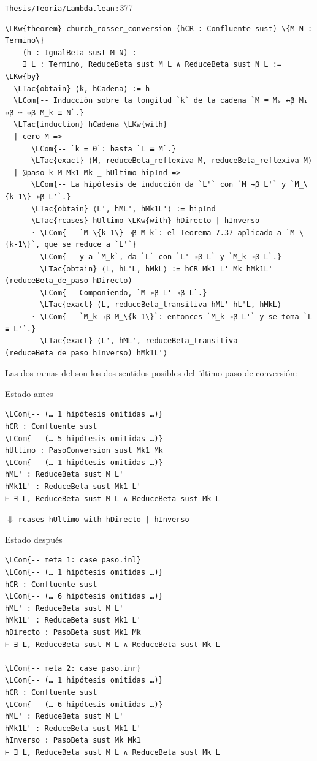 \documentclass[11pt,a4paper]{article}
\newcommand{\LKw}[1]{\textcolor{kw}{\bfseries #1}}
\newcommand{\LTac}[1]{\textcolor{tac}{\bfseries #1}}
\newcommand{\LCom}[1]{\textcolor{com}{\itshape #1}}
\newcommand{\lean}[1]{\texttt{\directlua{leanbreak("\luaescapestring{\detokenize{#1}}")}}}
\newcommand{\ruta}[2]{\texttt{#1}\,:\,#2}
\newcommand{\tacticaentre}[1]{\begin{center}\vspace{-2pt}\(\Downarrow\)\enspace
  \texttt{\small #1}\vspace{-2pt}\end{center}}
\begin{document}
\begin{codigolean}{\ruta{Thesis/Teoria/Lambda.lean}{377}}
\begin{Verbatim}[commandchars=\\\{\}]
\LKw{theorem} church_rosser_conversion (hCR : Confluente sust) \{M N : Termino\}
    (h : IgualBeta sust M N) :
    ∃ L : Termino, ReduceBeta sust M L ∧ ReduceBeta sust N L := \LKw{by}
  \LTac{obtain} ⟨k, hCadena⟩ := h
  \LCom{-- Inducción sobre la longitud `k` de la cadena `M ≡ M₀ ↔β M₁ ↔β ⋯ ↔β M_k ≡ N`.}
  \LTac{induction} hCadena \LKw{with}
  | cero M =>
      \LCom{-- `k = 0`: basta `L ≡ M`.}
      \LTac{exact} ⟨M, reduceBeta_reflexiva M, reduceBeta_reflexiva M⟩
  | @paso k M Mk1 Mk _ hUltimo hipInd =>
      \LCom{-- La hipótesis de inducción da `L'` con `M ↠β L'` y `M_\{k-1\} ↠β L'`.}
      \LTac{obtain} ⟨L', hML', hMk1L'⟩ := hipInd
      \LTac{rcases} hUltimo \LKw{with} hDirecto | hInverso
      · \LCom{-- `M_\{k-1\} →β M_k`: el Teorema 7.37 aplicado a `M_\{k-1\}`, que se reduce a `L'`}
        \LCom{-- y a `M_k`, da `L` con `L' ↠β L` y `M_k ↠β L`.}
        \LTac{obtain} ⟨L, hL'L, hMkL⟩ := hCR Mk1 L' Mk hMk1L' (reduceBeta_de_paso hDirecto)
        \LCom{-- Componiendo, `M ↠β L' ↠β L`.}
        \LTac{exact} ⟨L, reduceBeta_transitiva hML' hL'L, hMkL⟩
      · \LCom{-- `M_k →β M_\{k-1\}`: entonces `M_k ↠β L'` y se toma `L ≡ L'`.}
        \LTac{exact} ⟨L', hML', reduceBeta_transitiva (reduceBeta_de_paso hInverso) hMk1L'⟩
\end{Verbatim}
\end{codigolean}
Las dos ramas del \lean{rcases} son los dos sentidos posibles del último paso
de conversión:
\begin{estadolean}{Estado antes}
\begin{Verbatim}[commandchars=\\\{\}]
\LCom{-- (… 1 hipótesis omitidas …)}
hCR : Confluente sust
\LCom{-- (… 5 hipótesis omitidas …)}
hUltimo : PasoConversion sust Mk1 Mk
\LCom{-- (… 1 hipótesis omitidas …)}
hML' : ReduceBeta sust M L'
hMk1L' : ReduceBeta sust Mk1 L'
⊢ ∃ L, ReduceBeta sust M L ∧ ReduceBeta sust Mk L
\end{Verbatim}
\end{estadolean}
\tacticaentre{rcases hUltimo with hDirecto | hInverso}
\begin{estadolean}{Estado después}
\begin{Verbatim}[commandchars=\\\{\}]
\LCom{-- meta 1: case paso.inl}
\LCom{-- (… 1 hipótesis omitidas …)}
hCR : Confluente sust
\LCom{-- (… 6 hipótesis omitidas …)}
hML' : ReduceBeta sust M L'
hMk1L' : ReduceBeta sust Mk1 L'
hDirecto : PasoBeta sust Mk1 Mk
⊢ ∃ L, ReduceBeta sust M L ∧ ReduceBeta sust Mk L

\LCom{-- meta 2: case paso.inr}
\LCom{-- (… 1 hipótesis omitidas …)}
hCR : Confluente sust
\LCom{-- (… 6 hipótesis omitidas …)}
hML' : ReduceBeta sust M L'
hMk1L' : ReduceBeta sust Mk1 L'
hInverso : PasoBeta sust Mk Mk1
⊢ ∃ L, ReduceBeta sust M L ∧ ReduceBeta sust Mk L
\end{Verbatim}
\end{estadolean}
\end{document}
